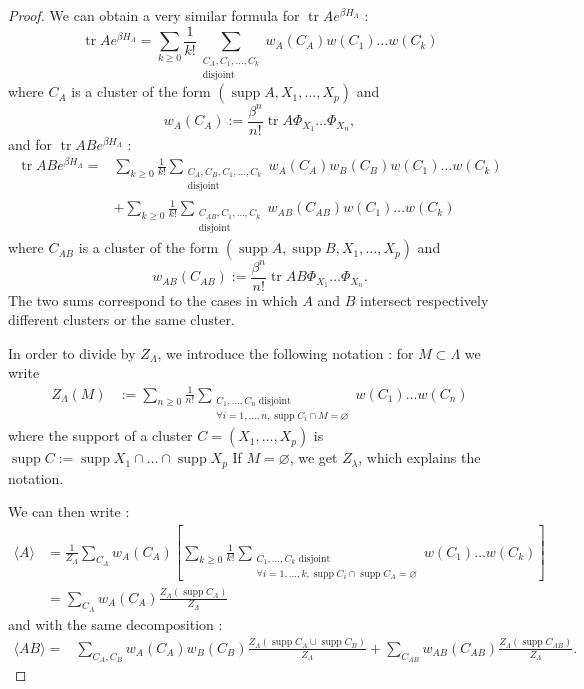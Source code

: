 \documentclass[french]{article}
\DeclareMathOperator{\disj}{disjoint}
\DeclareMathOperator{\tr}{tr}
\DeclareMathOperator{\supp}{supp}
\begin{document}
\begin{proof}
    We can obtain a very similar formula for $\tr Ae^{\beta H_\Lambda}$ :
    \begin{equation*}
        \tr Ae^{\beta H_\Lambda}=\sum_{k\geq 0}\frac 1 {k!} \sum_{\substack{C_A,C_1,\ldots,C_k\\\disj}}w_A(C_A)w(C_1)\ldots w(C_k)
    \end{equation*}
    where $C_A$ is a cluster of the form $(\supp A,X_1,\ldots,X_p)$ and $$
        w_A(C_A):=\frac{\beta^n}{n!}\tr A\Phi_{X_1}\ldots\Phi_{X_n},
    $$
    and for $\tr ABe^{\beta H_\Lambda}$ :\begin{align*}
        \tr ABe^{\beta H_\Lambda}=&\sum_{k\geq 0}\frac 1 {k!} \sum_{\substack{C_A,C_B,C_1,\ldots,C_k\\\disj}}w_A(C_A)w_B(C_B)w(C_1)\ldots w(C_k)\\
        &+\sum_{k\geq 0}\frac 1 {k!} \sum_{\substack{C_{AB},C_1,\ldots,C_k\\\disj}}w_{AB}(C_{AB})w(C_1)\ldots w(C_k)
        \end{align*}
        where $C_{AB}$ is a cluster of the form $(\supp A, \supp B,X_1,\ldots,X_p)$ and
        $$
        w_{AB}(C_{AB}):=\frac{\beta^n}{n!}\tr AB\Phi_{X_1}\ldots\Phi_{X_n}.
        $$
        The two sums correspond to the cases in which $A$ and $B$ intersect respectively different clusters or the same cluster.
     
    In order to divide by $Z_\Lambda$, we introduce the following notation : for $M\subset \Lambda$ we write
    \begin{align*}
        Z_\Lambda(M)&:=\sum_{n\geq0}\frac 1{n!} \sum_{\substack{
            C_1,\ldots,C_n \disj\\
            \forall i=1,\ldots,n, \supp C_i\cap M =\varnothing
            }}w(C_1)\ldots w(C_n)
    \end{align*}
    where the support of a cluster $C=(X_1,\ldots,X_p)$ is $\supp C:=\supp X_1\cap\ldots\cap\supp X_p$
    If $M=\varnothing$, we get $Z_\lambda$, which explains the notation.
    
    We can then write :
    \begin{align*}
        \langle A\rangle &= \frac 1 {Z_\Lambda}\sum_{C_A}w_A(C_A)\left[\sum_{k\geq 0} \frac 1{k!}\sum_{\substack{C_1,\ldots,C_k\disj\\\forall i=1,\ldots,k, \supp C_i\cap \supp C_A=\varnothing}}w(C_1)\ldots w(C_k)\right]\\
        &=\sum_{C_A}w_A(C_A)\frac{Z_\Lambda(\supp C_A)}{Z_\Lambda}
    \end{align*}
    and with the same decomposition :
    \begin{align*}
        \langle AB\rangle=& \sum_{C_{A},C_B}w_A(C_A)w_B(C_B)\frac{Z_\Lambda(\supp C_A \cup \supp C_B)}{Z_\Lambda}+\sum_{C_{AB}}w_{AB}(C_{AB})\frac{Z_\Lambda(\supp C_{AB})}{Z_\Lambda}.
    \end{align*}
\end{proof}
 
 
 
 \printbibliography
\end{document}
